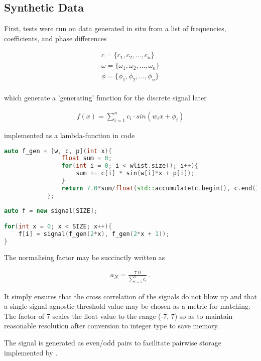 \subsection{Synthetic Data}

First, tests were run on data generated in situ from a list of frequencies, coefficients, and phase differences

\begin{align*}
    c = \{c_1, c_2, \ldots, c_n\}\\
    \omega = \{\omega_1, \omega_2, \ldots, \omega_n\}\\
    \phi = \{\phi_1, \phi_2, \ldots, \phi_n\}\\
\end{align*}

which generate a 'generating' function for the discrete signal later

\begin{align*}
    f(x) = \sum_{i = 1}^{n} c_i \cdot sin(w_i x + \phi_i)
\end{align*}

implemented as a lambda-function in code 

\begin{lstlisting}[language=C++]
auto f_gen = [w, c, p](int x){
                float sum = 0;
                for(int i = 0; i < wlist.size(); i++){
                    sum += c[i] * sin(w[i]*x + p[i]);
                }
                return 7.0*sum/float(std::accumulate(c.begin(), c.end(), 0));
            };
            
auto f = new signal[SIZE];

for(int x = 0; x < SIZE; x++){
    f[i] = signal(f_gen(2*x), f_gen(2*x + 1));
}
\end{lstlisting}

The normalising factor may be succinctly written as 

\begin{align*}
    a_N = \frac{7.0}{\sum_{i = 1}^{n}c_i}~.
\end{align*}

It simply ensures that the cross correlation of the signals do not blow up and
that a single signal agnostic threshold value may be chosen as a metric for
matching. The factor of 7 scales the float value to the range (-7, 7) so as to
maintain reasonable resolution after conversion to integer type to save memory.

The signal is generated as even/odd pairs to facilitate pairwise storage
implemented by .

